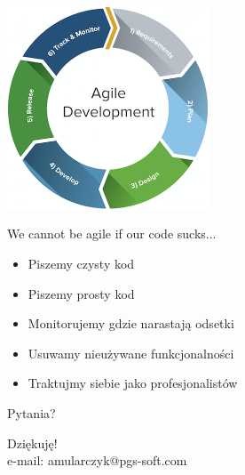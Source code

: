 \documentclass{beamer}
\begin{document}
\begin{frame}{}
\begin{center}
  	\includegraphics[height=6cm]{agile.png}
\end{center}
\end{frame}

\begin{frame}{}
\begin{center}
{\color{red}\Large{We cannot be agile if our code sucks...}}
\end{center}
\end{frame}

\begin{frame}{}
     \begin{Large}
	\begin{itemize}
		\item Piszemy czysty kod
		\item Piszemy prosty kod
		\item Monitorujemy gdzie narastają odsetki
		\item Usuwamy nieużywane funkcjonalności
		\item Traktujmy siebie jako profesjonalistów
	\end{itemize}
     \end{Large}
\end{frame}


\begin{frame}{Pytania?}
\begin{center}
\Huge{Dziękuję!}\\
\Large{e-mail: amularczyk@pgs-soft.com}
\end{center}
\end{frame}
\end{document}
